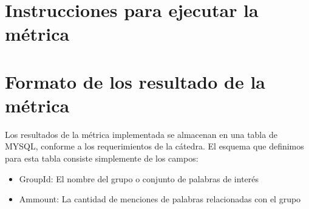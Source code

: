 \documentclass[a4paper,10pt]{article}
\begin{document}
\section{Instrucciones para ejecutar la métrica}

\small
\section{Formato de los resultado de la métrica}

Los resultados de la métrica implementada se almacenan en una tabla de MYSQL, conforme a los requerimientos de la cátedra. El esquema que definimos para esta tabla consiste 
simplemente de los campos:

\begin{itemize}
    \item GroupId: El nombre del grupo o conjunto de palabras de interés
    \item Ammount: La cantidad de menciones de palabras relacionadas con el grupo
\end{itemize}
\end{document}
